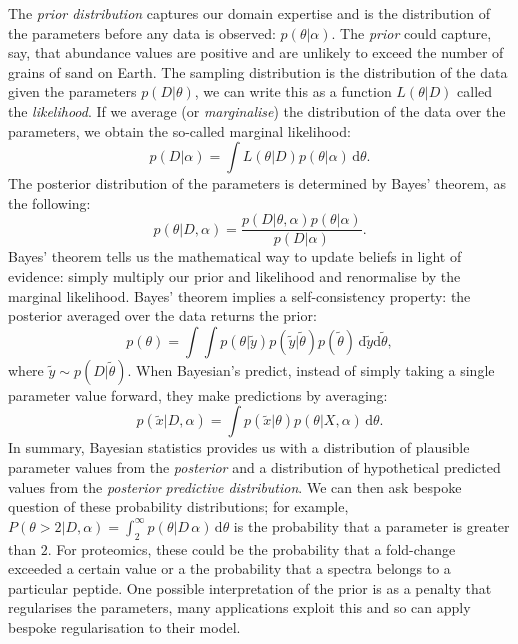 \documentclass[12pt,english]{article}
\begin{document}
The \textit{prior distribution} captures our domain expertise and is the distribution of the parameters before any data is observed: $p(\theta|\alpha)$. The \textit{prior} could capture, say, that abundance values are positive and are unlikely to exceed the number of grains of sand on Earth. The sampling distribution is the distribution of the data given the parameters $p(D|\theta)$, we can write this as a function $L(\theta|D)$ called the \textit{likelihood}. If we average (or \textit{marginalise}) the distribution of the data over the parameters, we obtain the so-called marginal likelihood:
\begin{equation}
p(D|\alpha) = \int L(\theta|D)p(\theta|\alpha)\,\text{d}\theta.
\end{equation}
The posterior distribution of the parameters is determined by Bayes' theorem, as the following:
\begin{equation}
p(\theta|D, \alpha) = \frac{p(D|\theta, \alpha)p(\theta|\alpha)}{p(D|\alpha)}.
\end{equation}
Bayes' theorem tells us the mathematical way to update beliefs in light of evidence: simply multiply our prior and likelihood and renormalise by the marginal likelihood. Bayes' theorem implies a self-consistency property: the posterior averaged over the data returns the prior:
\begin{equation}
p(\theta) = \int \int p(\theta|\tilde{y})p(\tilde{y}|\tilde{\theta})p(\tilde{\theta})\,\text{d}\tilde{y}\text{d}\tilde{\theta},
\end{equation}
where $\tilde{y} \sim p(D|\tilde{\theta})$. When Bayesian's predict, instead of simply taking a single parameter value forward, they make predictions by averaging:
\begin{equation}
p(\tilde{x}|D,\alpha) = \int p(\tilde{x}|\theta)p(\theta|X,\alpha)\,\text{d}\theta.
\end{equation}
In summary, Bayesian statistics provides us with a distribution of plausible parameter values from the \textit{posterior} and a distribution of hypothetical predicted values from the \textit{posterior predictive distribution}. We can then ask bespoke question of these probability distributions; for example, $P(\theta > 2|D, \alpha) = \int_{2}^{\infty}p(\theta|D\,\alpha)\,\text{d}\theta$ is the probability that a parameter is greater than $2$. For proteomics, these could be the probability that a fold-change exceeded a certain value or a the probability that a spectra belongs to a particular peptide. One possible interpretation of the prior is as a penalty that regularises the parameters, many applications exploit this and so can apply bespoke regularisation to their model. 
\end{document}
